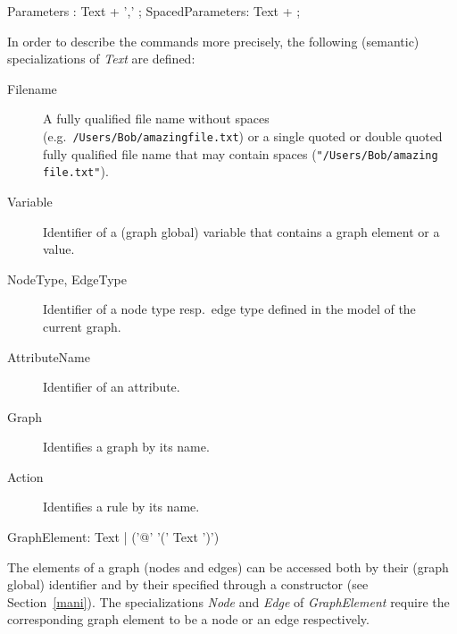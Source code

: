 \begin{rail} 
 Parameters : Text + ',' ;
 SpacedParameters: Text + ; 
\end{rail}

In order to describe the commands more precisely, the following (semantic) specializations of \emph{Text} are defined:
\begin{description}
  \item[Filename]A fully qualified file name without spaces (e.g.\ \texttt{/Users/Bob/amazing\textunderscore file.txt}) or a single quoted or double quoted fully qualified file name that may contain spaces (\texttt{"/Users/Bob/amazing file.txt"}).
  \item[Variable] Identifier of a (graph global) variable that contains a graph element or a value. 
  \item[NodeType, EdgeType] Identifier of a node type resp.\ edge type defined in the model of the current graph.
  \item[AttributeName] Identifier of an attribute.
  \item[Graph] Identifies a graph by its name.
  \item[Action] Identifies a rule by its name.
\end{description}
\makeatletter
\begin{rail}
  GraphElement: Text | ('@' '(' Text ')')
\end{rail}
\makeatother

The elements of a graph (nodes and edges) can be accessed both by their (graph global)  identifier and by their  specified through a constructor (see Section~\ref{mani}).
The specializations \emph{Node} and \emph{Edge} of \emph{GraphElement} require the corresponding graph element to be a node or an edge respectively.

